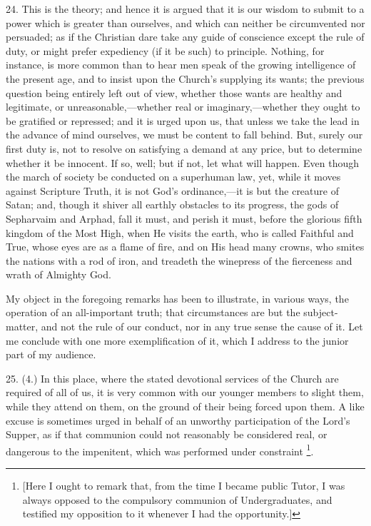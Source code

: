 24. This is the theory; and hence it is argued that it is our
wisdom to submit to a power which is greater than ourselves, and which
can neither be circumvented nor persuaded; as if the Christian dare
take any guide of conscience except the rule of duty, or might prefer
expediency (if it be such) to principle. Nothing, for instance, is
more common than to hear men speak of the growing intelligence of the
present age, and to insist upon the Church's supplying its wants; the
previous question being entirely left out of view, whether those wants
are healthy and legitimate, or unreasonable,—whether real or
imaginary,—whether they ought to be gratified or repressed; and it
is urged upon us, that unless we take the lead in the advance of mind
ourselves, we must be content to fall behind. But, surely our first
duty is, not to resolve on satisfying a demand at any price, but to
determine whether it be innocent. If so, well; but if not, let what
will happen. Even though the march of society be conducted on a
superhuman law, yet, while it moves against Scripture Truth, it is not
God's ordinance,—it is but the creature of Satan; and, though it
shiver all earthly obstacles to its progress, the gods of Sepharvaim
and Arphad, fall it must, and perish it must, before the glorious
fifth kingdom of the Most High, when He visits the earth, who is
called Faithful and True, whose eyes are as a flame of fire, and on
His head many crowns, who smites the nations with a rod of iron, and
treadeth the winepress of the fierceness and wrath of Almighty God.

My object in the foregoing remarks has been to illustrate, in
various ways, the operation of an all-important truth; that
circumstances are but the subject-matter, and not the rule of our
conduct, nor in any true sense the cause of it. Let me conclude with
one more exemplification of it, which I address to the junior part of
my audience.

25. (4.) In this place, where the stated devotional services of the
Church are required of all of us, it is very common with our younger
members to slight them, while they attend on them, on the ground of
their being forced upon them. A like excuse is sometimes urged in
behalf of an unworthy participation of the Lord's Supper, as if that
communion could not reasonably be considered real, or dangerous to the
impenitent, which was performed under constraint \footnote{[Here I ought to remark that, from the time
I became public Tutor, I was always opposed to the compulsory
communion of Undergraduates, and testified my opposition to it
whenever I had the opportunity.]}.

